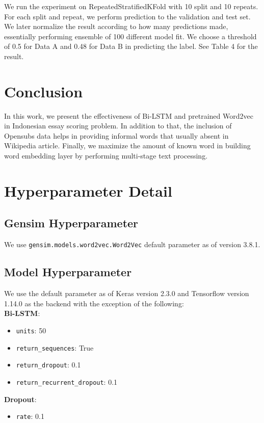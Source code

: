 \documentclass[11pt,a4paper]{article}
\begin{document}
We run the experiment on RepeatedStratifiedKFold with 10 split and 10 repeats. For each split and repeat, we perform prediction to the validation and test set. We later normalize the result according to how many predictions made, essentially performing ensemble of 100 different model fit. We choose a threshold of 0.5 for Data A and 0.48 for Data B in predicting the label. See Table 4 for the result.

\section{Conclusion}

In this work, we present the effectiveness of Bi-LSTM and pretrained Word2vec in Indonesian essay scoring problem. In addition to that, the inclusion of Opensubs data helps in providing informal words that usually absent in Wikipedia article. Finally, we maximize the amount of known word in building word embedding layer by performing multi-stage text processing.




\appendix

\section{Hyperparameter Detail}
\subsection{Gensim Hyperparameter}
We use \verb|gensim.models.word2vec.Word2Vec| default parameter as of version 3.8.1.
\subsection{Model Hyperparameter}
We use the default parameter as of Keras version 2.3.0 and Tensorflow version 1.14.0 as the backend with the exception of the following:
\\

\textbf{Bi-LSTM}:
\begin{itemize}
\item \verb|units|: 50
\item \verb|return_sequences|: True
\item \verb|return_dropout|: 0.1
\item \verb|return_recurrent_dropout|: 0.1
\end{itemize}

\textbf{Dropout}:
\begin{itemize}
\item \verb|rate|: 0.1
\end{itemize}
\end{document}
